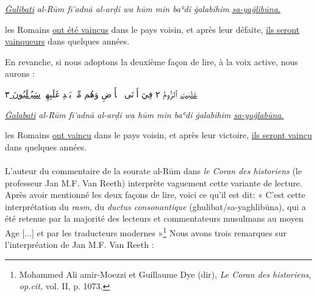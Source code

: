 \documentclass[a4paper,12pt]{report}
\begin{document}
\begin{itemize}
\begin{enumerate}
\begin{center}
    

\underline{ \textit{Ġulibati}} \textit{al-Rūm fī  ͗adnā al-arḍi wa hūm min baʿdi  ġalabihim} \underline {\textit{sa-yaġlibūna.}}

les Romains \underline{ont été vaincus} dans le pays voisin, et après leur défaite, \underline{ils seront vainqueurs} dans quelques années. 
\end{center}
 
En revanche, si nous adoptons la deuxième façon de lire, à la voix active, nous aurons : 

\begin{Arabic}
    \begin{center}
      \underline{ غَلَبَتِ}   ٱلرُّومُ
٢
فِيٓ أَدۡنَى ٱلۡأَرۡضِ 
 وَهُم مِّنۢ 
 بَعۡدِ غَلَبِهِمۡ 
 \underline {سَيُغۡلَبُونَ }
 ٣
    \end{center}
\end{Arabic}



 \begin{center}
     
 

\underline {\textit{Ġalabati}}\textit{ al-Rūm fī  ͗adnā al-arḍi wa hūm min baʿdi  ġalabihim }\underline {\textit{sa-yuġlabūna}.}

les Romains \underline {ont  vaincu} dans le pays voisin, et après leur victoire, \underline {ils seront vainçu} dans quelques années. 


    
\end{center}

\paragraph{}
L'auteur du commentaire de la sourate al-Rūm  dans   \textit{le Coran des historiens} (le professeur Jan M.F. Van Reeth)  interprète vaguement cette variante de lecture.  Après avoir mentionné les deux façons de lire, voici  ce qu'il est dit:  « C'est cette interprétation du \textit{rasm}, du \textit{ductus consonantique} (ghulibat/sa-yaghlib\=una), qui a été retenue par la majorité des lecteurs et commentateurs musulmans au moyen Age [...] et par les traducteurs modernes »\footnote{Mohammed Ali amir-Moezzi et Guillaume Dye (dir),\textit{ Le Coran des historiens}, \textit{op.cit,} vol. II, p. 1073.} Nous avons trois remarques sur l'interpréation de Jan M.F. Van Reeth :


\end{enumerate}
\end{itemize}
\end{document}
